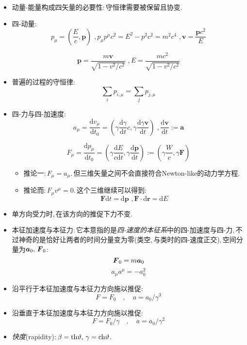 \begin{itemize}
\item 动量-能量构成四矢量的必要性:\,守恒律需要被保留且协变.

\item 四-动量:
\[p_{\mu}=\left( \frac{E}{c}, \boldsymbol{p} \right) \,\,, p_{\mu}p^{\mu}c^2=E^2-p^2c^2=m^2c^4\,\,, \boldsymbol{v}=\frac{\boldsymbol{p}c^2}{E}\]

\[\boldsymbol{p}=\frac{m\boldsymbol{v}}{\sqrt{1-v^2/c^2}}\,\,, E=\frac{mc^2}{\sqrt{1-v^2/c^2}}\]

\item 普遍的过程的守恒律:
\[\sum_i{p_{i,\mu}}=\sum_j{p_{j,\mu}}\]

\item 四-力与四-加速度:
\[a_{\mu}=\frac{\text{d}v_{\mu}}{\text{d}t_0}=\left( \gamma \frac{\text{d}\gamma}{\text{d}t}c, \gamma \frac{\text{d}\gamma \boldsymbol{v}}{\text{d}t} \right) \,\,, \frac{\text{d}\boldsymbol{v}}{\text{d}t}:=\boldsymbol{a}\]

\[F_{\mu}=\frac{\text{d}p_{\mu}}{\text{d}t_0}=\left( \gamma \frac{\text{d}E}{c\text{d}t},\gamma \frac{\text{d}\boldsymbol{p}}{\text{d}t} \right) :=\left( \gamma \frac{W}{c},\gamma \boldsymbol{F} \right) \]

\begin{itemize}
\item 推论一:\,$F_\mu=a_\mu$.\,但三维矢量之间不会直接符合Newton-like的动力学方程.

\item 推论而:\,$F_\mu v^\mu=0$.\,这个三维继续可以得到:
\[\boldsymbol{F}\text{d}t=\text{d}\boldsymbol{p}\,\,, \boldsymbol{F}\cdot \text{d}\boldsymbol{r}=\text{d}E\]
\end{itemize}

\item 单方向受力时,\,在该方向的推促下力不变.

\item 本征加速度与本征力:\,它本意指的是\emph{四-速度的本征系}中的四-加速度与四-力,\,不过神奇的是恰好让两者的时间分量变为零(类空,\,与类时的四-速度正交),\,空间分量为$\boldsymbol{a}_0,\,\boldsymbol{F}_0$:
\[\boldsymbol{F}_0=m\boldsymbol{a}_0\]
\[a_\mu a^\mu=-a_0^2\]

\item 沿平行于本征加速度与本征力方向施以推促:
\[F=F_0\quad ,\quad a=a_0/\gamma^3\]

\item 沿垂直于本征加速度与本征力方向施以推促:
\[F=F_0/\gamma\quad ,\quad a=a_0/\gamma^2\]

\item \emph{快度}(rapidity):\,$\beta={\rm th} \vartheta,\,\gamma={\rm ch} \vartheta$.


\end{itemize}
